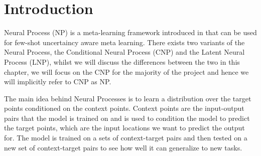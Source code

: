 \documentclass[../../main.tex]{subfiles}
\begin{document}
\section{Introduction}

Neural Process (NP) is a meta-learning framework introduced in \cite{garnelo2018neural, garnelo2018conditional} that can be used for few-shot uncertaincy aware meta learning. There exists two variants of the Neural Process, the Conditional Neural Process (CNP) and the Latent Neural Process (LNP), whilst we will discuss the differences between the two in this chapter, we will focus on the CNP for the majority of the project and hence we will implicitly refer to CNP as NP. 

The main idea behind Neural Processes is to learn a distribution over the target points conditioned on the context points. Context points are the input-output pairs that the model is trained on and is used to condition the model to predict the target points, which are the input locations we want to predict the output for. The model is trained on a sets of context-target pairs and then tested on a new set of context-target pairs to see how well it can generalize to new tasks. 




\end{document}
